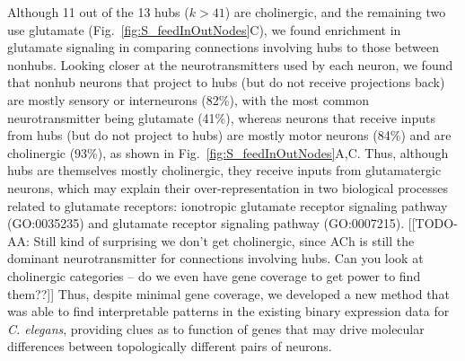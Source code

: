 \documentclass[10pt,letterpaper]{article}
\begin{document}
Although 11 out of the 13 hubs ($k > 41$) are cholinergic, and the remaining two use glutamate (Fig.~\ref{fig:S_feedInOutNodes}C), we found enrichment in glutamate signaling in comparing connections involving hubs to those between nonhubs.
Looking closer at the neurotransmitters used by each neuron, we found that nonhub neurons that project to hubs (but do not receive projections back) are mostly sensory or interneurons (82\%), with the most common neurotransmitter being glutamate (41\%), whereas neurons that receive inputs from hubs (but do not project to hubs) are mostly motor neurons (84\%) and are cholinergic (93\%), as shown in Fig.~\ref{fig:S_feedInOutNodes}A,C.
Thus, although hubs are themselves mostly cholinergic, they receive inputs from glutamatergic neurons, which may explain their over-representation in two biological processes related to glutamate receptors: ionotropic glutamate receptor signaling pathway (GO:0035235) and glutamate receptor signaling pathway (GO:0007215).
[[TODO-AA: Still kind of surprising we don't get cholinergic, since ACh is still the dominant neurotransmitter for connections involving hubs. Can you look at cholinergic categories -- do we even have gene coverage to get power to find them??]]
Thus, despite minimal gene coverage, we developed a new method that was able to find interpretable patterns in the existing binary expression data for \emph{C. elegans}, providing clues as to function of genes that may drive molecular differences between topologically different pairs of neurons.

\end{document}
